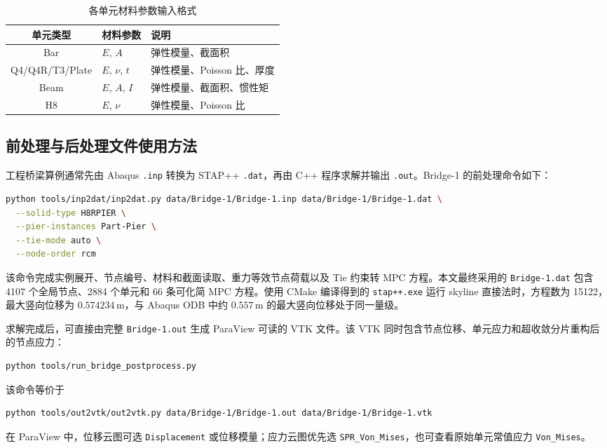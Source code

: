 \documentclass[UTF8,a4paper,zihao=-4]{ctexart}
\begin{document}
\begin{table}[H]
    \centering
    \caption{各单元材料参数输入格式}
    \label{tab:mat_format}
    \begin{tabular}{cll}
        \toprule
        单元类型 & 材料参数 & 说明\\
        \midrule
        Bar & $E$, $A$ & 弹性模量、截面积\\
        Q4/Q4R/T3/Plate & $E$, $\nu$, $t$ & 弹性模量、Poisson 比、厚度\\
        Beam & $E$, $A$, $I$ & 弹性模量、截面积、惯性矩\\
        H8 & $E$, $\nu$ & 弹性模量、Poisson 比\\
        \bottomrule
    \end{tabular}
\end{table}

\subsection{前处理与后处理文件使用方法}

工程桥梁算例通常先由 Abaqus \texttt{.inp} 转换为 STAP++ \texttt{.dat}，再由 C++ 程序求解并输出 \texttt{.out}。Bridge-1 的前处理命令如下：
\begin{lstlisting}[language=bash,caption={Bridge-1 前处理转换命令}]
python tools/inp2dat/inp2dat.py data/Bridge-1/Bridge-1.inp data/Bridge-1/Bridge-1.dat \
  --solid-type H8RPIER \
  --pier-instances Part-Pier \
  --tie-mode auto \
  --node-order rcm
\end{lstlisting}

该命令完成实例展开、节点编号、材料和截面读取、重力等效节点荷载以及 Tie 约束转 MPC 方程。本文最终采用的 \texttt{Bridge-1.dat} 包含 4107 个全局节点、2884 个单元和 66 条可化简 MPC 方程。使用 CMake 编译得到的 \texttt{stap++.exe} 运行 skyline 直接法时，方程数为 15122，最大竖向位移为 $0.574234\,\mathrm{m}$，与 Abaqus ODB 中约 $0.557\,\mathrm{m}$ 的最大竖向位移处于同一量级。

求解完成后，可直接由完整 \texttt{Bridge-1.out} 生成 ParaView 可读的 VTK 文件。该 VTK 同时包含节点位移、单元应力和超收敛分片重构后的节点应力：
\begin{lstlisting}[language=bash,caption={Bridge-1 后处理命令}]
python tools/run_bridge_postprocess.py
\end{lstlisting}
该命令等价于
\begin{lstlisting}[language=bash]
python tools/out2vtk/out2vtk.py data/Bridge-1/Bridge-1.out data/Bridge-1/Bridge-1.vtk
\end{lstlisting}
在 ParaView 中，位移云图可选 \texttt{Displacement} 或位移模量；应力云图优先选 \texttt{SPR\_Von\_Mises}，也可查看原始单元常值应力 \texttt{Von\_Mises}。
\end{document}

